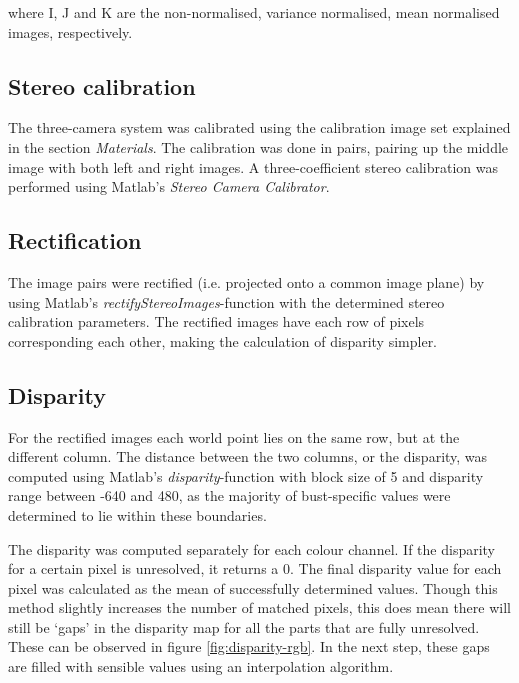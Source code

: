 \documentclass[journal]{IEEEtran}
\begin{document}
\noindent where I, J and K are the non-normalised, variance normalised, mean normalised images, respectively.


\subsection{Stereo calibration}

The three-camera system was calibrated using the calibration image set explained in the section \textit{Materials}. 
The calibration was done in pairs, pairing up the middle image with both left and right images.
A three-coefficient stereo calibration was performed using Matlab's \textit{Stereo Camera Calibrator}.


\subsection{Rectification}

The image pairs were rectified (i.e. projected onto a common image plane) by using Matlab's \textit{rectifyStereoImages}-function with the determined stereo calibration parameters.
The rectified images have each row of pixels corresponding each other, making the calculation of disparity simpler.


\subsection{Disparity}

For the rectified images each world point lies on the same row, but at the different column. 
The distance between the two columns, or the disparity, was computed using Matlab's \textit{disparity}-function with block size of 5 and disparity range between -640 and 480, as the majority of bust-specific values were determined to lie within these boundaries.  %

The disparity was computed separately for each colour channel. If the disparity for a certain pixel is unresolved, it returns a 0. The final disparity value for each pixel was calculated as the mean of successfully determined values. Though this method slightly increases the number of matched pixels, this does mean there will still be `gaps' in the disparity map for all the parts that are fully unresolved. These can be observed in figure \ref{fig:disparity-rgb}. In the next step, these gaps are filled with sensible values using an interpolation algorithm.
\end{document}
